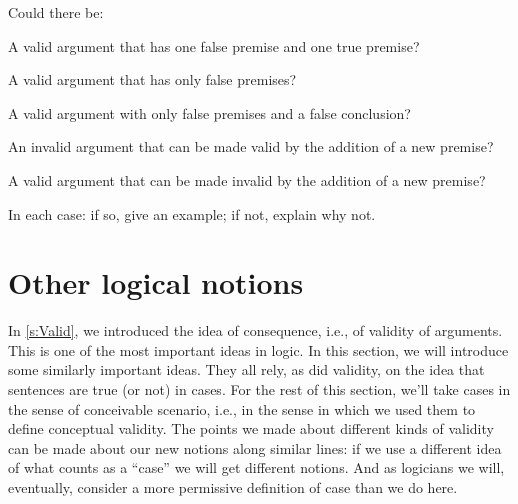\problempart
\label{pr.EnglishCombinations}
Could there be:
	\begin{compactlist}
		\item A valid argument that has one false premise and one true premise?
		\item A valid argument that has only false premises?
		\item A valid argument with only false premises and a false conclusion?
		\item An invalid argument that can be made valid by the addition of a new premise?
		\item A valid argument that can be made invalid by the addition of a new premise?
	\end{compactlist}
In each case: if so, give an example; if not, explain why not.


\chapter{Other logical notions}\label{s:BasicNotions}

In \cref{s:Valid}, we introduced the idea of consequence, i.e., of
validity of arguments. This is one of the most important ideas in
logic. In this section, we will introduce some similarly important
ideas. They all rely, as did validity, on the idea that sentences are
true (or not) in cases. For the rest of this section, we'll take cases
in the sense of conceivable scenario, i.e., in the sense in which we
used them to define conceptual validity. The points we made about
different kinds of validity can be made about our new notions along
similar lines: if we use a different idea of what counts as a ``case''
we will get different notions.  And as logicians we will, eventually,
consider a more permissive definition of case than we do here.


